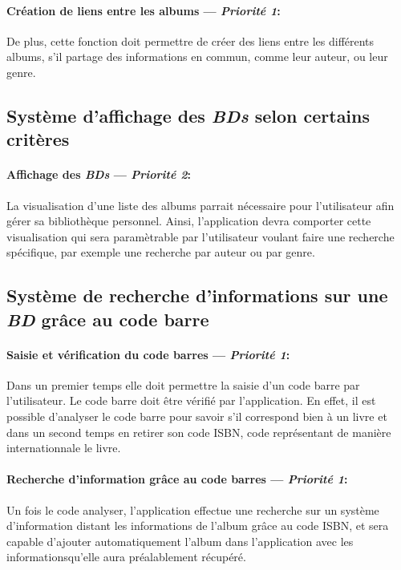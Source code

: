 \paragraph{Création de liens entre les albums ---  \textit{Priorité 1}:}  
De plus, cette fonction doit permettre de créer des liens entre les différents albums, s'il partage des informations en commun, comme leur auteur, ou leur genre.

\subsection{Système d'affichage des \emph{BDs} selon certains critères}
\paragraph{Affichage des \emph{BDs} ---  \textit{Priorité 2}:}

La visualisation d'une liste des albums parrait nécessaire pour l'utilisateur afin gérer sa bibliothèque personnel. Ainsi, l'application devra comporter cette visualisation qui sera paramètrable par l'utilisateur voulant faire une recherche spécifique, par exemple une recherche par auteur ou par genre.

\subsection{Système de recherche d'informations sur une \emph{BD}  grâce au code barre}

\paragraph{Saisie et vérification du code barres ---  \textit{Priorité 1}:}
Dans un premier temps elle doit permettre la saisie d'un code barre par l'utilisateur. Le code barre doit être vérifié par l'application. En effet, il est possible d'analyser le code barre pour savoir s'il correspond bien à un livre et dans un second temps en retirer son code ISBN, code représentant de manière internationnale le livre.
\paragraph{Recherche d'information grâce au code barres ---  \textit{Priorité 1}:}  
Un fois le code analyser, l'application effectue une recherche sur un système d'information distant les informations de l'album grâce au code ISBN, et sera capable d'ajouter automatiquement l'album dans l'application avec les informationsqu'elle aura préalablement récupéré.
